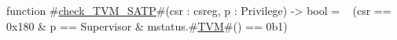 function #\hyperref[sailRISCVzcheckzyTVMzySATP]{check\_TVM\_SATP}#(csr : csreg, p : Privilege) -> bool =
  ~ (csr == 0x180 & p == Supervisor & mstatus.#\hyperref[sailRISCVzTVM]{TVM}#() == 0b1)
